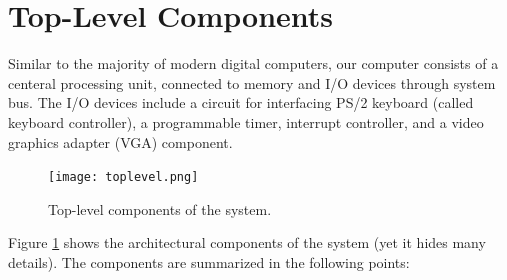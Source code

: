 \documentclass[oneside]{book}
\begin{document}
\section{Top-Level Components}

Similar to the majority of modern digital computers, our computer consists
of a centeral processing unit, connected to memory and I/O devices
through system bus. The I/O devices include a circuit for interfacing
PS/2 keyboard (called keyboard controller), a programmable timer,
interrupt controller, and a video graphics adapter (VGA) component.\\

\begin{figure}[h]
\begin{center}
\texttt{[image: toplevel.png]}
\end{center}
\caption{Top-level components of the system.}
\label{toplevel}
\end{figure}

Figure \ref{toplevel} shows the architectural components of the system
(yet it hides many details). The components are summarized in the
following points:
\end{document}
